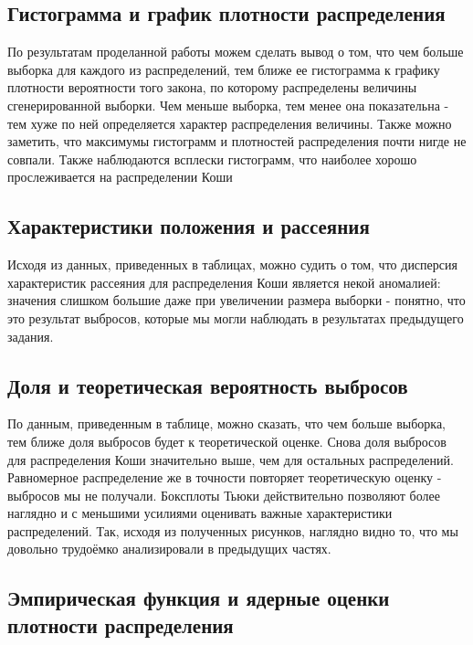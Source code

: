 \documentclass[../main.tex]{subfiles}
\begin{document}
    \subsection{Гистограмма и график плотности распределения}
    
    \noindent По результатам проделанной работы можем сделать вывод о том, что чем больше выборка для каждого из распределений, тем ближе ее гистограмма к графику плотности вероятности того закона, по которому распределены величины сгенерированной выборки. Чем меньше выборка, тем менее она показательна - тем хуже по ней определяется характер распределения величины. 
    \noindent Также можно заметить, что максимумы гистограмм и плотностей распределения почти нигде не совпали. Также наблюдаются всплески гистограмм, что наиболее хорошо прослеживается на распределении Коши

    
    \subsection{Характеристики положения и рассеяния}
    
    \noindent Исходя из данных, приведенных в таблицах, можно судить о том, что дисперсия характеристик рассеяния для распределения Коши является некой аномалией: значения слишком большие даже при увеличении размера выборки - понятно, что это результат выбросов, которые мы могли наблюдать в результатах предыдущего задания.


    \subsection{Доля и теоретическая вероятность выбросов}
    
    \noindent По данным, приведенным в таблице, можно сказать, что чем больше выборка, тем ближе доля выбросов будет к теоретической оценке. Снова доля выбросов для распределения Коши значительно выше, чем для остальных распределений. Равномерное распределение же в точности повторяет теоретическую оценку - выбросов мы не получали. 
    \noindent Боксплоты Тьюки действительно позволяют более наглядно и с меньшими усилиями оценивать важные характеристики распределений. Так, исходя из полученных рисунков, наглядно видно то, что мы довольно трудоёмко анализировали в предыдущих частях.

    \subsection{Эмпирическая функция и ядерные оценки плотности распределения}
    
\end{document}
